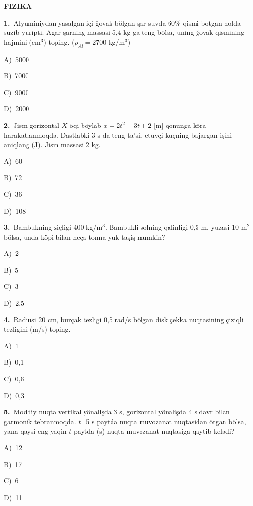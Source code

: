 \documentclass[11pt,a4paper]{article}
\newcommand{\opt}[2]{\hspace*{4mm}#1)\ #2\par}
\begin{document}
\begin{center}{\Large\textbf{FIZIKA}}\end{center}
\noindent\begin{minipage}{\linewidth}
\textbf{1.}\ Alyuminiydan yasalgan içi ğovak bölgan şar suvda 60\% qismi botgan holda suzib yuripti. Agar şarning massasi 5,4 kg ga teng bölsa, uning ğovak qismining hajmini (cm$^{3}$) toping. ($\rho_{Al}=2700$ kg/m$^{3}$)\par\smallskip
\opt{A}{5000}
\opt{B}{7000}
\opt{C}{9000}
\opt{D}{2000}
\end{minipage}\vspace{9pt}\par
\noindent\begin{minipage}{\linewidth}
\textbf{2.}\ Jism gorizontal $X$ öqi böylab $x=2t^2-3t+2$ [m] qonunga köra harakatlanmoqda. Dastlabki 3 s da teng ta’sir etuvçi kuçning bajargan işini aniqlang (J). Jism massasi 2 kg.\par\smallskip
\opt{A}{60}
\opt{B}{72}
\opt{C}{36}
\opt{D}{108}
\end{minipage}\vspace{9pt}\par
\noindent\begin{minipage}{\linewidth}
\textbf{3.}\ Bambukning ziçligi 400 kg/m$^{3}$. Bambukli solning qalinligi 0,5 m, yuzasi 10 m$^{2}$ bölsa, unda köpi bilan neça tonna yuk taşiş mumkin?\par\smallskip
\opt{A}{2}
\opt{B}{5}
\opt{C}{3}
\opt{D}{2,5}
\end{minipage}\vspace{9pt}\par
\noindent\begin{minipage}{\linewidth}
\textbf{4.}\ Radiusi 20 cm, burçak tezligi 0,5 rad/s bölgan disk çekka nuqtasining çiziqli tezligini (m/s) toping.\par\smallskip
\opt{A}{1}
\opt{B}{0,1}
\opt{C}{0,6}
\opt{D}{0,3}
\end{minipage}\vspace{9pt}\par
\noindent\begin{minipage}{\linewidth}
\textbf{5.}\ Moddiy nuqta vertikal yönalişda 3 s, gorizontal yönalişda 4 s davr bilan garmonik tebranmoqda. $t$=5 s paytda nuqta muvozanat nuqtasidan ötgan bölsa, yana qaysi eng yaqin $t$ paytda (s) nuqta muvozanat nuqtasiga qaytib keladi?\par\smallskip
\opt{A}{12}
\opt{B}{17}
\opt{C}{6}
\opt{D}{11}
\end{minipage}\vspace{9pt}\par
\end{document}
